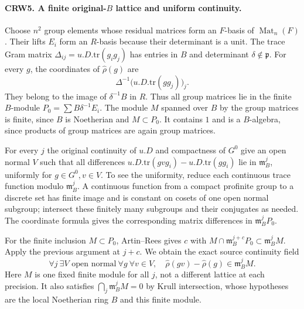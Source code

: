 \paragraph{CRW5. A finite original-$B$ lattice and uniform continuity.}
\label{claim:CRW5}
Choose $n^2$ group elements whose residual matrices form an
$F$-basis of $\operatorname{Mat}_n(F)$.  Their lifts $E_i$ form
an $R$-basis because their determinant is a unit.  The trace
Gram matrix $\Delta_{ij}=u.D.\mathrm{tr}(g_i g_j)$ has entries
in $B$ and determinant $\delta\notin\mathfrak p$.
For every $g$, the coordinates of $\widehat\rho(g)$ are
\[
 \Delta^{-1}
 \big(u.D.\mathrm{tr}(g g_j)\big)_j.
\]
They belong to the image of $\delta^{-1}B$ in $R$.
Thus all group matrices lie in the finite $B$-module
$P_0=\sum B\delta^{-1}E_i$.
The module $M$ spanned over $B$ by the group matrices is
finite, since $B$ is Noetherian and $M\subset P_0$.
It contains $1$ and is a $B$-algebra, since products of group
matrices are again group matrices.

For every $j$ the original continuity of $u.D$ and compactness
of $G^0$ give an open normal $V$ such that all differences
$u.D.\mathrm{tr}(gv g_i)-u.D.\mathrm{tr}(g g_i)$ lie in
$\mathfrak m_B^j$, uniformly for $g\in G^0,v\in V$.
To see the uniformity, reduce each continuous trace function
modulo $\mathfrak m_B^j$.  A continuous function from a compact
profinite group to a discrete set has finite image and is
constant on cosets of one open normal subgroup; intersect
these finitely many subgroups and their conjugates as needed.
The coordinate formula gives the corresponding matrix
differences in $\mathfrak m_B^jP_0$.

For the finite inclusion $M\subset P_0$, Artin--Rees gives
$c$ with
$M\cap\mathfrak m_B^{j+c}P_0\subset\mathfrak m_B^jM$.
Apply the previous argument at $j+c$.  We obtain the exact
source continuity field
\[
 \forall j\ \exists V\text{ open normal}\ \forall g\ \forall v\in V,
 \quad\widehat\rho(gv)-\widehat\rho(g)\in\mathfrak m_B^jM.
                                                               \tag{CRW.11}
\]
Here $M$ is one fixed finite module for all $j$, not a different
lattice at each precision.  It also satisfies
$\bigcap_j\mathfrak m_B^jM=0$ by Krull intersection, whose
hypotheses are the local Noetherian ring $B$ and this finite
module.

